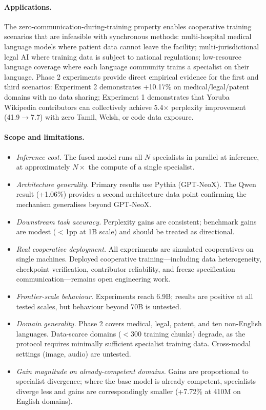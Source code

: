 \documentclass{article}
\begin{document}
\paragraph{Applications.} The zero-communication-during-training property enables cooperative training scenarios that are infeasible with synchronous methods: multi-hospital medical language models where patient data cannot leave the facility; multi-jurisdictional legal AI where training data is subject to national regulations; low-resource language coverage where each language community trains a specialist on their language. Phase 2 experiments provide direct empirical evidence for the first and third scenarios: Experiment 2 demonstrates +10.17\% on medical/legal/patent domains with no data sharing; Experiment 1 demonstrates that Yoruba Wikipedia contributors can collectively achieve 5.4$\times$ perplexity improvement (41.9$\to$7.7) with zero Tamil, Welsh, or code data exposure.

\paragraph{Scope and limitations.}
\begin{itemize}[leftmargin=*, itemsep=1pt]
  \item \emph{Inference cost.} The fused model runs all $N$ specialists in parallel at inference, at approximately $N\times$ the compute of a single specialist.
  \item \emph{Architecture generality.} Primary results use Pythia (GPT-NeoX). The Qwen result (+1.06\%) provides a second architecture data point confirming the mechanism generalises beyond GPT-NeoX.
  \item \emph{Downstream task accuracy.} Perplexity gains are consistent; benchmark gains are modest ($<$1pp at 1B scale) and should be treated as directional.
  \item \emph{Real cooperative deployment.} All experiments are simulated cooperatives on single machines. Deployed cooperative training---including data heterogeneity, checkpoint verification, contributor reliability, and freeze specification communication---remains open engineering work.
  \item \emph{Frontier-scale behaviour.} Experiments reach 6.9B; results are positive at all tested scales, but behaviour beyond 70B is untested.
  \item \emph{Domain generality.} Phase 2 covers medical, legal, patent, and ten non-English languages. Data-scarce domains (${<}$300 training chunks) degrade, as the protocol requires minimally sufficient specialist training data. Cross-modal settings (image, audio) are untested.
  \item \emph{Gain magnitude on already-competent domains.} Gains are proportional to specialist divergence; where the base model is already competent, specialists diverge less and gains are correspondingly smaller (+7.72\% at 410M on English domains).
\end{itemize}
\end{document}
